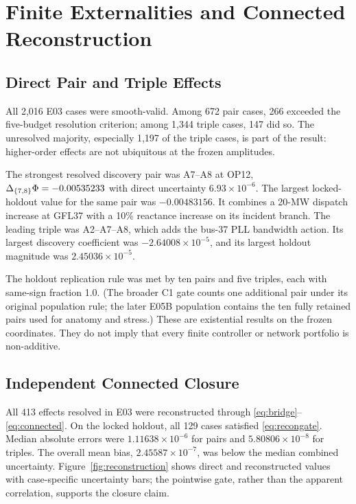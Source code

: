 \section{Finite Externalities and Connected Reconstruction}
\subsection{Direct Pair and Triple Effects}

All 2,016 E03 cases were smooth-valid. Among 672 pair cases, 266 exceeded the
five-budget resolution criterion; among 1,344 triple cases, 147 did so. The
unresolved majority, especially 1,197 of the triple cases, is part of the
result: higher-order effects are not ubiquitous at the frozen amplitudes.

The strongest resolved discovery pair was A7--A8 at OP12,
$\Delta_{\{7,8\}}\Phi=-0.00535233$ with direct uncertainty
$6.93\times10^{-6}$. The largest locked-holdout value for the same pair was
$-0.00483156$. It combines a 20-MW dispatch increase at GFL37 with a 10\%
reactance increase on its incident branch. The leading triple was A2--A7--A8,
which adds the bus-37 PLL bandwidth action. Its largest discovery coefficient
was $-2.64008\times10^{-5}$, and its largest holdout magnitude was
$2.45036\times10^{-5}$.

The holdout replication rule was met by ten pairs and five triples, each with
same-sign fraction 1.0. (The broader C1 gate counts one additional pair under
its original population rule; the later E05B population contains the ten
fully retained pairs used for anatomy and stress.) These are existential
results on the frozen coordinates. They do not imply that every finite
controller or network portfolio is non-additive.

\subsection{Independent Connected Closure}

All 413 effects resolved in E03 were reconstructed through
\eqref{eq:bridge}--\eqref{eq:connected}. On the locked holdout, all 129 cases
satisfied \eqref{eq:recongate}. Median absolute errors were
$1.11638\times10^{-6}$ for pairs and $5.80806\times10^{-8}$ for triples.
The overall mean bias, $2.45587\times10^{-7}$, was below the median combined
uncertainty. Figure~\ref{fig:reconstruction} shows direct and reconstructed
values with case-specific uncertainty bars; the pointwise gate, rather than
the apparent correlation, supports the closure claim.

